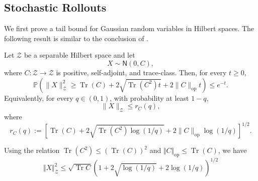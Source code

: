 \documentclass[11pt]{article}
\begin{document}
\subsection{Stochastic Rollouts}
We first prove a tail bound for Gaussian random variables in Hilbert spaces. The following result is similar to the conclusion of \cite{hsu2012tail}.
\begin{lemma}
\label{lem:hilbert-gaussian-tail}
Let $\mathcal Z$ be a separable Hilbert space and let
\[
    X\sim \mathsf N(0,C),
\]
where $C:\mathcal Z\to\mathcal Z$ is positive, self-adjoint, and trace-class. Then, for every
$t\ge 0$,
\[
    \mathbb P
    \left(
    \|X\|_{\mathcal Z}^2
    \ge
    \operatorname{Tr}(C)
    +
    2\sqrt{\operatorname{Tr}(C^2)t}
    +
    2\|C\|_{\mathrm{op}}t
    \right)
    \le
    e^{-t}.
\]
Equivalently, for every $q\in(0,1)$, with probability at least $1-q$,
\[
    \|X\|_{\mathcal Z}
    \le r_C(q),
\]
where
\[
    r_C(q)
    :=
    \left[
    \operatorname{Tr}(C)
    +
    2\sqrt{\operatorname{Tr}(C^2)\log(1/q)}
    +
    2\|C\|_{\mathrm{op}}\log(1/q)
    \right]^{1/2}.
\]
\end{lemma}
\begin{remark}
Using the relation $\operatorname{Tr}(C^2)\leq(\operatorname{Tr}(C))^2$ and $\Vert C\Vert_\mathrm{op}\leq\operatorname{Tr}(C)$, we have
\begin{equation*}
    \Vert X\Vert_\mathcal{Z}^2\leq\sqrt{\operatorname{Tr} C}\left(1+2\sqrt{\log(1/q)}+2\log(1/q)\right)^{1/2}
\end{equation*}
\end{remark}
\end{document}
